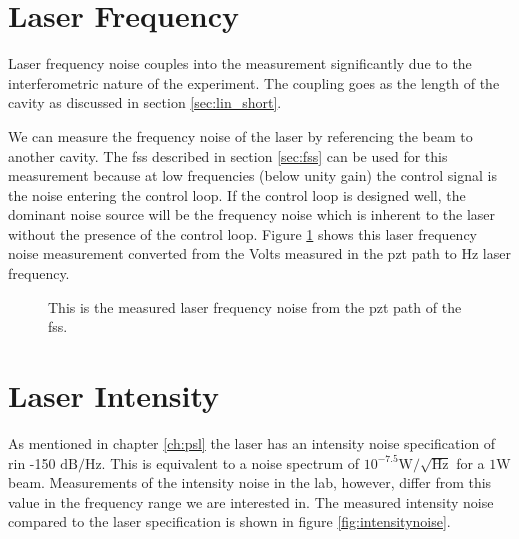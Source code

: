 
\section{Laser Frequency}

Laser frequency noise couples into the measurement significantly due to the
interferometric nature of the experiment.
The coupling goes as the length of the cavity as discussed in section
\ref{sec:lin_short}.

We can measure the frequency noise of the laser by referencing the beam to
another cavity. The \ac{fss} described in section \ref{sec:fss} can be used
for this measurement because at low frequencies (below unity gain) the control
signal is the noise entering the control loop.
If the control loop is designed well, the dominant noise source will be the
frequency noise which is inherent to the laser without the presence of the
control loop.
Figure \ref{fig:frequencynoise} shows this laser frequency noise measurement
converted from the Volts measured in the \ac{pzt} path to Hz laser frequency.


\begin{figure}
  \caption[Frequency Noise]{This is the measured laser frequency noise
    from the \ac{pzt} path of the \ac{fss}.
    }
  \label{fig:frequencynoise}
\end{figure}


\section{Laser Intensity}

As mentioned in chapter \ref{ch:psl} the laser has an intensity noise
specification of \ac{rin} -150 $\mathrm{dB}/\mathrm{Hz}$. This is equivalent to a noise
spectrum of $10^{-7.5} \mathrm{W}/\sqrt{\mathrm{Hz}}$ for a $1 \mathrm{W}$ beam.
Measurements of the intensity noise in the lab, however, differ from this
value in the frequency range we are interested in.
The measured intensity noise compared to the laser specification is shown
in figure \ref{fig:intensitynoise}.

